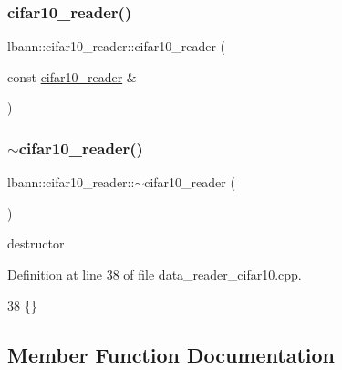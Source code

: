 \subsubsection{\texorpdfstring{cifar10\+\_\+reader()}{cifar10\_reader()}\hspace{0.1cm}{\footnotesize\ttfamily [2/2]}}
{\footnotesize\ttfamily lbann\+::cifar10\+\_\+reader\+::cifar10\+\_\+reader (\begin{DoxyParamCaption}\item[{const \hyperlink{classlbann_1_1cifar10__reader}{cifar10\+\_\+reader} \&}]{ }\end{DoxyParamCaption})\hspace{0.3cm}{\ttfamily [default]}}

\mbox{\label{classlbann_1_1cifar10__reader_a7830763d48562f43af206d2b0f4497c3}} 
\subsubsection{\texorpdfstring{$\sim$cifar10\+\_\+reader()}{~cifar10\_reader()}}
{\footnotesize\ttfamily lbann\+::cifar10\+\_\+reader\+::$\sim$cifar10\+\_\+reader (\begin{DoxyParamCaption}{ }\end{DoxyParamCaption})\hspace{0.3cm}{\ttfamily [override]}}



destructor 



Definition at line 38 of file data\+\_\+reader\+\_\+cifar10.\+cpp.


\begin{DoxyCode}
38 \{\}
\end{DoxyCode}


\subsection{Member Function Documentation}
\mbox{\label{classlbann_1_1cifar10__reader_a32206d0f0f7baf2471ed589ec4db356b}} 
